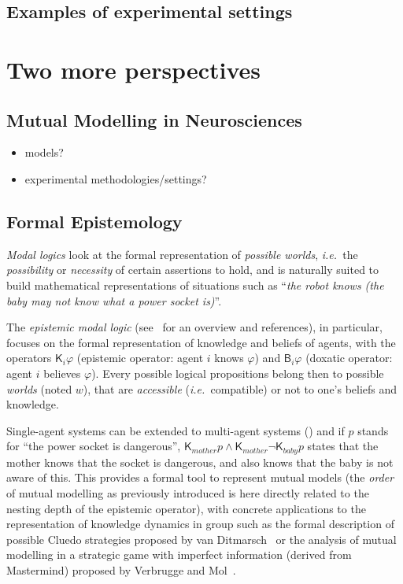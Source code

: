 \documentclass{sig-alternate}
\newcommand{\ie}{{\textit{i.e.~}}}
\begin{document}
\subsection{Examples of experimental settings}

\section{Two more perspectives}

\subsection{Mutual Modelling in Neurosciences}

\begin{itemize}
    \item models?
    \item experimental methodologies/settings?
\end{itemize}


\subsection{Formal Epistemology}
\label{formal-epistemology}

\emph{Modal logics} look at the formal representation of \emph{possible
worlds}, \ie the \emph{possibility} or \emph{necessity} of certain assertions
to hold, and is naturally suited to build mathematical representations of
situations such as ``\emph{the robot knows (the baby may not know what a power
socket is)}''.

The \emph{epistemic modal logic} (see~\cite{hendricks2008epistemic} for an
overview and references), in particular, focuses on the formal representation of
knowledge and beliefs of agents, with the operators $\mathsf{K}_{i}\varphi$
(epistemic operator: agent $i$ knows $\varphi$) and $\mathsf{B}_{i}\varphi$
(doxatic operator: agent $i$ believes $\varphi$). Every possible logical
propositions belong then to possible \emph{worlds} (noted $w$), that are
\emph{accessible} (\ie compatible) or not to one's beliefs and knowledge.

Single-agent systems can be extended to multi-agent systems (\cite[chapt.
4]{fagin1995reasoning}) and if $p$ stands for ``the power socket is dangerous'',
$\mathsf{K}_{mother}p \wedge \mathsf{K}_{mother}\neg\mathsf{K}_{baby}p$ states
that the mother knows that the socket is dangerous, and also knows that the baby
is not aware of this. This provides a formal tool to represent mutual models
(the \emph{order} of mutual modelling as previously introduced is here directly
related to the nesting depth of the epistemic operator), with concrete
applications to the representation of knowledge dynamics in group such as the
formal description of possible Cluedo strategies proposed by van
Ditmarsch~\cite{ditmarsch2002description} or the analysis of mutual modelling in
a strategic game with imperfect information (derived from Mastermind) proposed
by Verbrugge and Mol~\cite{verbrugge2008learning}.
\end{document}
